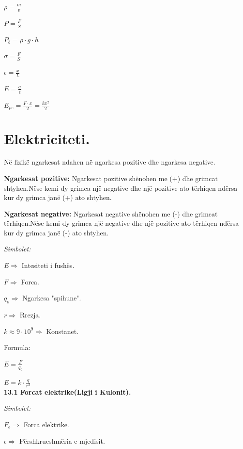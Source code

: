 \documentclass[twocolumn]{article}
\begin{document}
	$\rho = \frac{m}{v}$
	
	
	$P = \frac{F}{S}$
	
	$P_b= \rho \cdot g \cdot h$
	
	$\sigma = \frac{F}{S}$
	
	$\epsilon = \frac{x}{L}$
	
	$E=\frac{\sigma}{\epsilon}$
	
	$E_{pe}=\frac{F\cdot x}{2}=\frac{kx^2}{2}$
	
	
	
	
	
	\section{Elektriciteti.}
	Në fizikë ngarkesat ndahen në ngarkesa pozitive dhe ngarkesa negative.
	
	\textbf{Ngarkesat pozitive:}
	Ngarkesat pozitive shënohen me (+) dhe grimcat shtyhen.Nëse kemi dy grimca një
	negative dhe një pozitive ato tërhiqen ndërsa kur dy grimca janë (+) ato shtyhen.
	
	\textbf{Ngarkesat negative:}
	Ngarkesat negative shënohen me (-) dhe grimcat tërhiqen.Nëse kemi dy grimca një
	negative dhe një pozitive ato tërhiqen ndërsa kur dy grimca janë (-) ato shtyhen.
	
	\begin{center}
		\textit{Simbolet:}
	\end{center}
	
	$E \Rightarrow $ Intesiteti i fushës.
	
	$F \Rightarrow $ Forca.
	
	$q_o \Rightarrow $ Ngarkesa "spihune".
	
	$r \Rightarrow $ Rrezja.
	
	$k \approx 9\cdot10^9 \Rightarrow $ Konstanet.
	
	\begin{center}
		Formula:
	\end{center}
	
	$E=\frac{F}{q_0}$
	
	$E= k \cdot \frac{q}{r^2}$\\
	
	\textbf{13.1 Forcat elektrike(Ligji i Kulonit).}
	
	\begin{center}
		\textit{Simbolet:}
	\end{center}
	
	$F_e \Rightarrow $ Forca elektrike.
	
	$\epsilon \Rightarrow $  Përshkrueshmëria e mjedisit.
	
\end{document}
